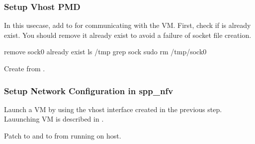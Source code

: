 \documentclass[a4paper,11pt,openany,oneside,english]{sphinxmanual}
\begin{document}
\subsubsection{Setup Vhost PMD}
\label{\detokenize{usecases/spp_nfv:setup-vhost-pmd}}
In this usecase, add  to  for communicating
with the VM.
First, check if  is already exist.
You should remove it already exist to avoid a failure of socket file
creation.

\begin{sphinxVerbatim}[commandchars=\\\{\},formatcom=\footnotesize]
 remove sock0  already exist
 ls /tmp  grep sock
 sudo rm /tmp/sock0
\end{sphinxVerbatim}

Create  from .

\begin{sphinxVerbatim}[commandchars=\\\{\},formatcom=\footnotesize]
\end{sphinxVerbatim}


\subsubsection{Setup Network Configuration in spp\_nfv}
\label{\detokenize{usecases/spp_nfv:setup-network-configuration-in-spp-nfv}}\label{\detokenize{usecases/spp_nfv:usecase-spp-nfv-l2fwd-vhost-nw}}
Launch a VM by using the vhost interface created in the previous step.
Lauunching VM is described in
{\hyperref[\detokenize{gsg/howto_use:spp-gsg-howto-use}]{}}.

Patch  to  and  to  from 
running on host.

\begin{sphinxVerbatim}[commandchars=\\\{\},formatcom=\footnotesize]
\end{sphinxVerbatim}
\end{document}
